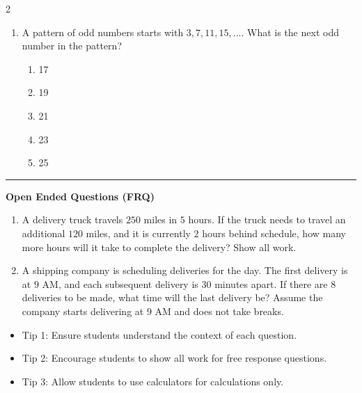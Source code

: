 \documentclass[10pt]{article}
\begin{document}
\begin{multicols}{2}
\begin{enumerate}[label=\textbf{Q\arabic*.}, leftmargin=*, itemsep=6pt, parsep=0pt]
  \item \small A pattern of odd numbers starts with $3, 7, 11, 15, ...$. What is the next odd number in the pattern?
  \begin{enumerate}[label=(\Alph*), leftmargin=0.6cm, nosep, itemsep=2pt]
    \item 17
    \item 19
    \item 21
    \item 23
    \item 25
  \end{enumerate}

\end{enumerate}
\end{multicols}

\vspace{-0.2cm}
\hrule
\vspace{0.2cm}
\textbf{\small Open Ended Questions (FRQ)}
\begin{enumerate}[label=\textbf{Q\arabic*.}, start=9, itemsep=5pt, topsep=0pt]

  \item \small A delivery truck travels $250$ miles in $5$ hours. If the truck needs to travel an additional $120$ miles, and it is currently $2$ hours behind schedule, how many more hours will it take to complete the delivery? Show all work. \vspace{2cm}

  \item \small A shipping company is scheduling deliveries for the day. The first delivery is at $9$ AM, and each subsequent delivery is $30$ minutes apart. If there are $8$ deliveries to be made, what time will the last delivery be? Assume the company starts delivering at $9$ AM and does not take breaks. \vspace{2cm}

\end{enumerate}

\vfill

\begin{tcolorbox}[colback=blue!5, colframe=mainblue!50, title=\small \textbf{Chef's Tips}, fonttitle=\bfseries, bottom=1mm]
\begin{itemize}[noitemsep, topsep=2pt, leftmargin=0.5cm]
  \item \scriptsize Tip 1: Ensure students understand the context of each question.\item \scriptsize Tip 2: Encourage students to show all work for free response questions.\item \scriptsize Tip 3: Allow students to use calculators for calculations only.
\end{itemize}
\end{tcolorbox}
\end{document}
